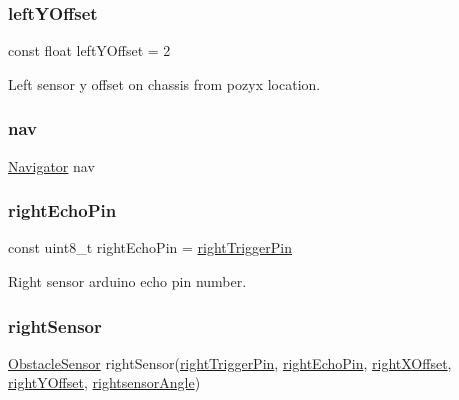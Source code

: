 \subsubsection{\texorpdfstring{left\+Y\+Offset}{leftYOffset}}
{\footnotesize\ttfamily const float left\+Y\+Offset = 2}



Left sensor y offset on chassis from pozyx location. 

\mbox{\label{bot_main_8ino_a4d757d2a3d2bcf4b98f6f4a72d7df7de}} 
\subsubsection{\texorpdfstring{nav}{nav}}
{\footnotesize\ttfamily \mbox{\hyperlink{class_navigator}{Navigator}} nav}

\mbox{\label{bot_main_8ino_a513a215c9894c01e37f389b072c5cec4}} 
\subsubsection{\texorpdfstring{right\+Echo\+Pin}{rightEchoPin}}
{\footnotesize\ttfamily const uint8\+\_\+t right\+Echo\+Pin = \mbox{\hyperlink{bot_main_8ino_a906054d9d48970211789ac841d331898}{right\+Trigger\+Pin}}}



Right sensor arduino echo pin number. 

\mbox{\label{bot_main_8ino_a4b08258caa24173f4153413d596aea69}} 
\subsubsection{\texorpdfstring{right\+Sensor}{rightSensor}}
{\footnotesize\ttfamily \mbox{\hyperlink{class_obstacle_sensor}{Obstacle\+Sensor}} right\+Sensor(\mbox{\hyperlink{bot_main_8ino_a906054d9d48970211789ac841d331898}{right\+Trigger\+Pin}}, \mbox{\hyperlink{bot_main_8ino_a513a215c9894c01e37f389b072c5cec4}{right\+Echo\+Pin}}, \mbox{\hyperlink{bot_main_8ino_ac932cddb5bc68094c96d0034c92faef9}{right\+X\+Offset}}, \mbox{\hyperlink{bot_main_8ino_a07903b96b48e8e456debd9cc43c7af05}{right\+Y\+Offset}}, \mbox{\hyperlink{bot_main_8ino_a83724535498f068d5b44150a2bc4fcf8}{rightsensor\+Angle}})}



